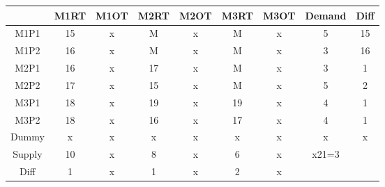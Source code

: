 \documentclass{article}%
\begin{document}
\begin{tabular}{c|c|ccccccc}
    & M1RT & M1OT & M2RT & M2OT & M3RT & M3OT & Demand               & Diff                 \\
    \midrule
    M1P1   & 15   & x    & M    & x    & M    & x    & 5                    & 15                   \\
    \cmidrule{2-9}
    M1P2   & 16   & x    & M    & x    & M    & x    & 3                    & 16                   \\
    \cmidrule{2-9}
    M2P1   & 16   & x    & 17   & x    & M    & x    & 3                    & 1                    \\
    M2P2   & 17   & x    & 15   & x    & M    & x    & 5                    & 2                    \\
    M3P1   & 18   & x    & 19   & x    & 19   & x    & 4                    & 1                    \\
    M3P2   & 18   & x    & 16   & x    & 17   & x    & 4                    & 1                    \\
    Dummy  & x    & x    & x    & x    & x    & x    & x                    & x                    \\
    Supply & 10   & x    & 8    & x    & 6    & x    & x21=3                &                      \\
    Diff   & 1    & x    & 1    & x    & 2    & x    &                      &                      \\
\end{tabular}
\newline
\newline
\end{document}
